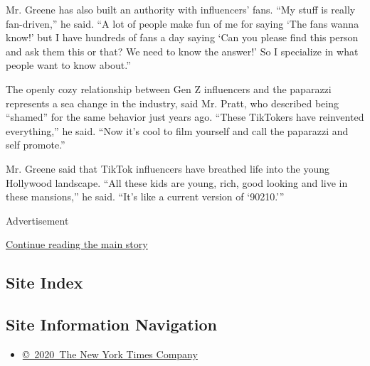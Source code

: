 Mr. Greene has also built an authority with influencers' fans. ``My
stuff is really fan-driven,'' he said. ``A lot of people make fun of me
for saying `The fans wanna know!' but I have hundreds of fans a day
saying `Can you please find this person and ask them this or that? We
need to know the answer!' So I specialize in what people want to know
about.''

The openly cozy relationship between Gen Z influencers and the paparazzi
represents a sea change in the industry, said Mr. Pratt, who described
being ``shamed'' for the same behavior just years ago. ``These TikTokers
have reinvented everything,'' he said. ``Now it's cool to film yourself
and call the paparazzi and self promote.''

Mr. Greene said that TikTok influencers have breathed life into the
young Hollywood landscape. ``All these kids are young, rich, good
looking and live in these mansions,'' he said. ``It's like a current
version of `90210.'''

Advertisement

\protect\hyperlink{after-bottom}{Continue reading the main story}

\hypertarget{site-index}{%
\subsection{Site Index}\label{site-index}}

\hypertarget{site-information-navigation}{%
\subsection{Site Information
Navigation}\label{site-information-navigation}}

\begin{itemize}
\tightlist
\item
  \href{https://help.nytimes3xbfgragh.onion/hc/en-us/articles/115014792127-Copyright-notice}{©~2020~The
  New York Times Company}
\end{itemize}

